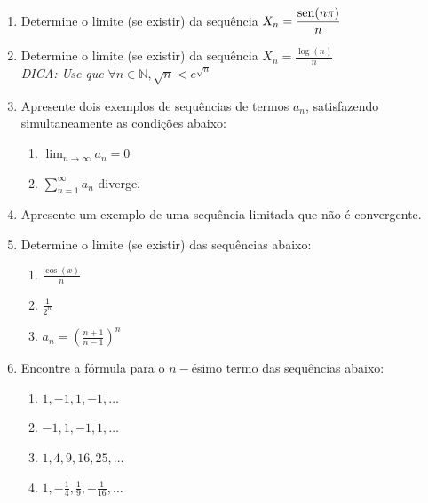 \documentclass[oneside,a4paper,12pt]{article}
\newcommand{\sen}{{\rm sen}}
\begin{document}
\begin{enumerate}

	\item Determine o limite (se existir) da sequência $X_n = \displaystyle \frac{\sen(n\pi)}{n}$
	\item Determine o limite (se existir) da sequência $X_n = \displaystyle \frac{\log(n)}{n}$ \\ \emph{DICA: Use que} $\forall n \in \mathbb{N}, \sqrt{n}<e^{\sqrt{n}}$
	\item Apresente dois exemplos de sequências de termos $a_n$, satisfazendo simultaneamente as condições abaixo:
        \begin{enumerate}
            \item $\displaystyle \lim_{n\to\infty}a_n=0$
            \item $\displaystyle \sum_{n=1}^{\infty}a_n$ diverge.
        \end{enumerate}
    \item Apresente um exemplo de uma sequência limitada que não é convergente.
    \item Determine o limite (se existir) das sequências abaixo:
        \begin{enumerate}
            \item $\displaystyle\frac{\cos(x)}{n}$
            \item $\displaystyle \frac{1}{2^n}$
            \item $a_n = \displaystyle \left(\frac{n+1}{n-1}\right)^n$
        \end{enumerate}
    \item Encontre a fórmula para o $n-$ésimo termo das sequências abaixo:
        \begin{enumerate}
            \item $1,-1,1,-1,\dots$
            \item $-1,1,-1,1,\dots$
            \item $1,4,9,16,25,\dots$
            \item $\displaystyle 1,-\frac{1}{4},\frac{1}{9},-\frac{1}{16},\dots$
        \end{enumerate}


\end{enumerate}
\end{document}
